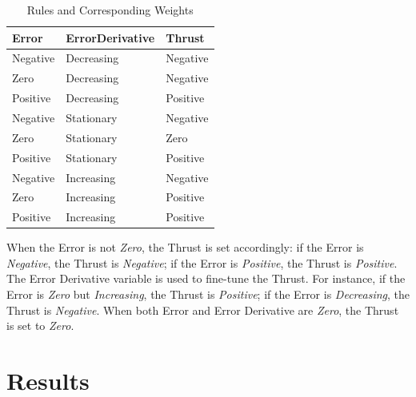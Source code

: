 \documentclass[12pt]{article}
\begin{document}
\begin{table}[h!]
    \centering
    \renewcommand{\arraystretch}{1.25} %
    \setlength{\tabcolsep}{10pt}      %
    \begin{tabular}{|p{3cm}|p{4cm}|p{3cm}|}
    \hline
    \textbf{\large Error} & \textbf{\large ErrorDerivative} & \textbf{\large Thrust} \\ \hline
    \large Negative       & \large Decreasing                & \large Negative        \\ \hline
    \large Zero           & \large Decreasing                & \large Negative        \\ \hline
    \large Positive       & \large Decreasing                & \large Positive        \\ \hline
    \large Negative       & \large Stationary                & \large Negative        \\ \hline
    \large Zero           & \large Stationary                & \large Zero            \\ \hline
    \large Positive       & \large Stationary                & \large Positive        \\ \hline
    \large Negative       & \large Increasing                & \large Negative        \\ \hline
    \large Zero           & \large Increasing                & \large Positive        \\ \hline
    \large Positive       & \large Increasing                & \large Positive        \\ \hline
    \end{tabular}
    \caption{Rules and Corresponding Weights}
    \label{tab:rules}
\end{table}

When the Error is not \textit{Zero}, the Thrust is set accordingly: if the Error is \textit{Negative}, the Thrust is \textit{Negative}; if the Error is \textit{Positive}, the Thrust is \textit{Positive}. The Error Derivative variable is used to fine-tune the Thrust. For instance, if the Error is \textit{Zero} but \textit{Increasing}, the Thrust is \textit{Positive}; if the Error is \textit{Decreasing}, the Thrust is \textit{Negative}. When both Error and Error Derivative are \textit{Zero}, the Thrust is set to \textit{Zero}.

\section{Results}
\end{document}
